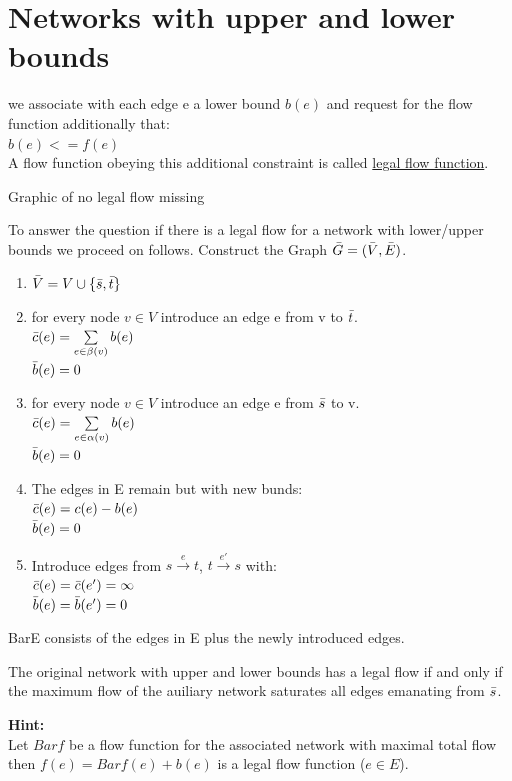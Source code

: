\section{Networks with upper and lower bounds}

we associate with each edge e a lower bound $b(e)$ and request for the flow function additionally that:\\
$b(e) <= f(e)$\\
A flow function obeying this additional constraint is called \underline{legal flow function}.

\begin{example}
Graphic of no legal flow missing
\end{example}

To answer the question if there is a legal flow for a network with lower/upper bounds we proceed on follows. Construct the Graph $\Bar{G} = (\Bar{V},\Bar{E})$.

\begin{enumerate}
  \item $\Bar{V} = V \cup \{\Bar{s}, \Bar{t}\}$
  \item for every node $v \in V$ introduce an edge e from v to $\Bar{t}$.\\
  $\Bar{c}(e) = \sum\limits_{e \in \beta (v)} b(e)$\\
  $\Bar{b}(e) = 0$
  \item for every node $v \in V$ introduce an edge e from $\Bar{s}$ to v.\\
  $\Bar{c}(e) = \sum\limits_{e \in \alpha (v)} b(e)$\\
  $\Bar{b}(e) = 0$
  \item The edges in E remain but with new bunds:\\
  $\Bar{c}(e) = c(e) - b(e)$\\
  $\Bar{b}(e) = 0$
  \item Introduce edges from $s \overset{e}\rightarrow t$, $t \overset{e'}\rightarrow s$ with:\\
  $\Bar{c}(e) = \Bar{c}(e') = \infty$\\
  $\Bar{b}(e) = \Bar{b}(e') = 0$
\end{enumerate}

Bar{E} consists of the edges in E plus the newly introduced edges.


\begin{lemma}
The original network with upper and lower bounds has a legal flow if and only if the maximum flow of the auiliary network saturates all edges emanating from $\Bar{s}$.
\end{lemma}


\textbf{Hint:}\\
Let $Bar{f}$ be a flow function for the associated network with maximal total flow then $f(e) = Bar{f}(e) + b(e)$ is a legal flow function ($e \in E$).

